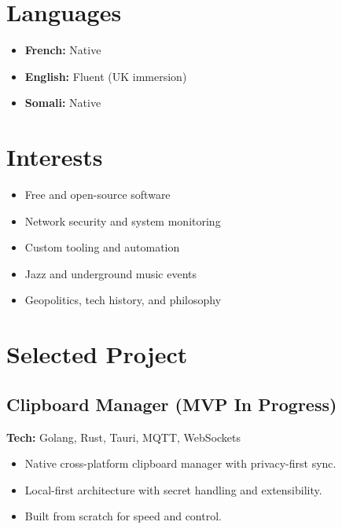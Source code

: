 \documentclass[11pt,a4paper]{article}
\begin{document}
\begin{paracol}{2}

\section*{Languages}
\begin{itemize}
  \item \textbf{French:} Native
  \item \textbf{English:} Fluent (UK immersion)
  \item \textbf{Somali:} Native
\end{itemize}

\vspace{1em}

\section*{Interests}
\begin{itemize}
  \item Free and open-source software
  \item Network security and system monitoring
  \item Custom tooling and automation
  \item Jazz and underground music events
  \item Geopolitics, tech history, and philosophy
\end{itemize}

\switchcolumn

\section*{Selected Project}
\subsection{Clipboard Manager (MVP In Progress)}
\textbf{Tech:} Golang, Rust, Tauri, MQTT, WebSockets
\begin{itemize}
    \item Native cross-platform clipboard manager with privacy-first sync.
    \item Local-first architecture with secret handling and extensibility.
    \item Built from scratch for speed and control.
\end{itemize}


\end{paracol}
\end{document}
